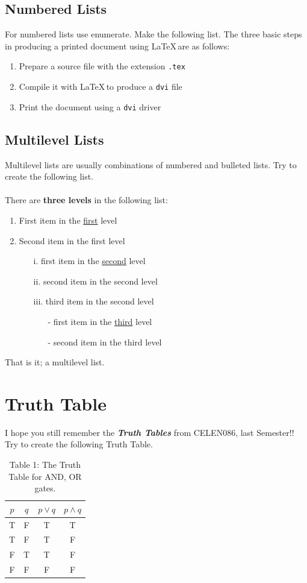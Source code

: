 \documentclass[a4paper, 11pt]{article}
\begin{document}
\subsection{Numbered Lists}
For numbered lists use enumerate. Make the following list.
The three basic steps in producing a printed document using \LaTeX \,are as follows:
\begin{enumerate}
\item Prepare a source file with the extension \texttt{.tex}
\item Compile it with \LaTeX\,to produce a \texttt{dvi} file
\item Print the document using a \texttt{dvi} driver 
\end{enumerate}

\subsection{Multilevel Lists}
Multilevel lists are usually combinations of numbered and bulleted lists. Try to create the following
list.\\\\
There are \textbf{three levels} in the following list:
\begin{enumerate}
\item First item in the \underline{first} level
\item Second item in the first level
\begin{itemize}
\item[i.] first item in the \underline{second} level
\item[ii.] second item in the second level
\item[iii.] third item in the second level
\begin{itemize}
\item[-] first item in the \underline{third} level
\item[-] second item in the third level
\end{itemize}
\end{itemize}
\end{enumerate}
That is it; a multilevel list.

\section{Truth Table}
I hope you still remember the \textit{\textbf{Truth Tables}} from CELEN086, last Semester!! Try to create the
following Truth Table.
\begin{table}[h]
\centering  
\begin{tabular}{c|c|c|c}            
$p$ & $q$ & $p\vee q$ & $p\wedge q$\\
\hline
\hline
T & F & T & T\\
T & F & T & F\\
F & T & T & F\\
F & F & F & F\\
\end{tabular}
\caption{Table 1: The Truth Table for AND, OR gates.}
\end{table}
\end{document}
